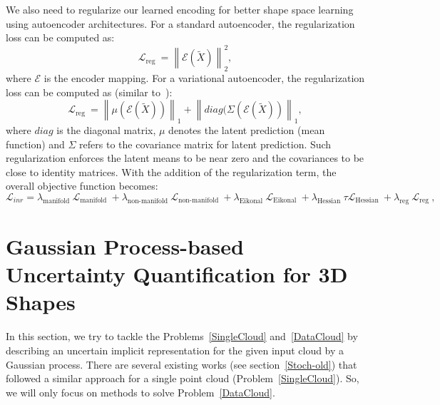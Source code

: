     We also need to regularize our learned encoding for better shape space learning using autoencoder architectures. For a standard autoencoder, the regularization loss can be computed as:
    \begin{equation}\label{reg_latent}
        \mathcal{L}_{\text {reg }} = \left\|\mathcal{E}(\tilde{X})\right\|_2^2,
    \end{equation}
    where $\mathcal{E}$ is the encoder mapping. For a variational autoencoder, the  regularization loss can be computed as (similar to~\cite{SAL}):
    \begin{equation}\label{reg_latent}
        \mathcal{L}_{\text {reg }} = \left\|\mu\left(\mathcal{E}(\tilde{X})\right)\right\|_1 +\left\|diag(\Sigma\left(\mathcal{E}(\tilde{X})\right)\right\|_1,
    \end{equation}
    where $diag$ is the diagonal matrix, $\mu$ denotes the latent prediction (mean function) and $\Sigma$ refers to the covariance matrix for latent prediction. Such regularization enforces the latent means to be near zero and the covariances to be close to identity matrices. With the addition of the regularization term, the overall objective function becomes:
    \begin{equation}\label{Hessian3}
        \mathcal{L}_{inr}= \lambda_{\text {manifold }} \mathcal{L}_{\text {manifold }}+\lambda_{\text {non-manifold }} \mathcal{L}_{\text {non-manifold }}+ \lambda_{\text {Eikonal }} \mathcal{L}_{\text {Eikonal }}+ \lambda_{\text{Hessian }} \tau \mathcal{L}_{\text{Hessian }} + \lambda_{\text {reg }} \mathcal{L}_{\text {reg }},
    \end{equation}

    

\section{Gaussian Process-based Uncertainty Quantification for 3D Shapes}\label{gpuq}
In this section, we try to tackle the Problems~\ref{SingleCloud} and~\ref{DataCloud} by describing an uncertain implicit representation for the given input cloud by a Gaussian process. There are several existing works (see section~\ref{Stoch-old}) that followed a similar approach for a single point cloud (Problem~\ref{SingleCloud}). So, we will only focus on methods to solve Problem~\ref{DataCloud}.

